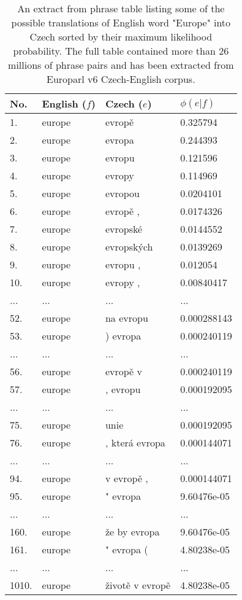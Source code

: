 
\begin{table}[h]
\centering
\begin{tabular}{ l l l l}
No. & English ($f$) & Czech ($e$) & $\phi(e|f)$ \\
\hline
\hline
1. & europe & evropě & 0.325794 \\
2. & europe & evropa & 0.244393 \\
3. & europe & evropu & 0.121596 \\
4. & europe & evropy & 0.114969 \\
5. & europe & evropou & 0.0204101 \\
6. & europe & evropě , & 0.0174326 \\
7. & europe & evropské & 0.0144552 \\
8. & europe & evropských & 0.0139269 \\
9. & europe & evropu , & 0.012054 \\
10. & europe & evropy , & 0.00840417 \\
... & ... & ... & ... \\
52. & europe & na evropu & 0.000288143 \\
53. & europe & ) evropa & 0.000240119 \\
... & ... & ... & ... \\
56. & europe & evropě v & 0.000240119 \\
57. & europe & , evropu & 0.000192095 \\
... & ... & ... & ... \\
75. & europe & unie & 0.000192095 \\
76. & europe & , která evropa & 0.000144071 \\
... & ... & ... & ... \\
94. & europe & v evropě , & 0.000144071 \\
95. & europe & " evropa & 9.60476e-05 \\
... & ... & ... & ... \\
160. & europe & že by evropa & 9.60476e-05 \\
161. & europe & " evropa ( & 4.80238e-05 \\
... & ... & ... & ... \\
1010. & europe & životě v evropě & 4.80238e-05 \\
\hline
\hline
\end{tabular}
\caption{\label{phrase-table-europarl}An extract from phrase table
listing some of the possible translations of English word "Europe"
into Czech sorted by their maximum likelihood probability.
The full table contained more than 26 millions of phrase pairs
and has been extracted from Europarl v6 Czech-English corpus.}
\end{table}

